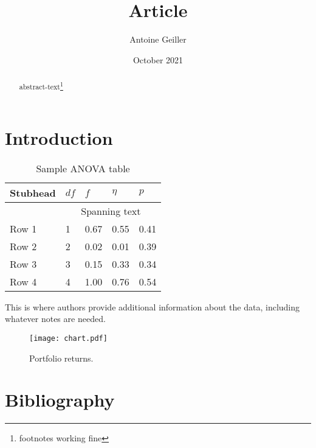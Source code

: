 \documentclass{article}
\title{Article}
\author{Antoine Geiller}
\affil{TeX.SX}
\date{October 2021}
\begin{document}
\maketitle

\begin{abstract}
    abstract-text\footnote{footnotes working fine}
\end{abstract}


\section{Introduction}

\blindtext[5]
\cite{Anat}
\cite{factor}

\begin{table}[h]
\centering
  \begin{threeparttable}
    \caption{Sample ANOVA table}
     \begin{tabular}{lllll}
        \toprule
        Stubhead & \( df \) & \( f \) & \( \eta \) & \( p \) \\
        \midrule
                 &     \multicolumn{4}{c}{Spanning text}     \\
        Row 1    & 1        & 0.67    & 0.55       & 0.41    \\
        Row 2    & 2        & 0.02    & 0.01       & 0.39    \\
        Row 3    & 3        & 0.15    & 0.33       & 0.34    \\
        Row 4    & 4        & 1.00    & 0.76       & 0.54    \\
        \bottomrule
     \end{tabular}
    \begin{tablenotes}
      \small
      \item This is where authors provide additional information about
      the data, including whatever notes are needed.
    \end{tablenotes}
  \end{threeparttable}
\end{table}


\begin{figure}[htp]
\begin{minipage}[b]{0.99\linewidth}
  \centering
  \texttt{[image: chart.pdf]}
  \caption{Portfolio returns.}
  \label{fig:blah1}
\end{minipage}
\end{figure}

\section{Bibliography}
\printbibliography
\end{document}
